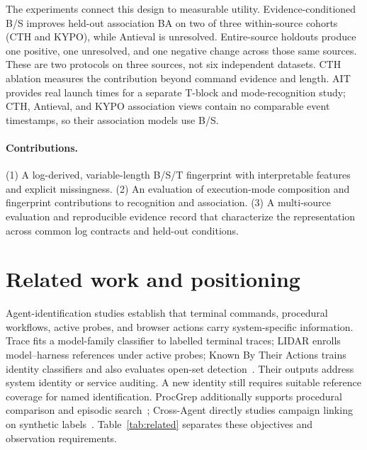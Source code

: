 \documentclass[10pt]{article}
\begin{document}
The experiments connect this design to measurable utility. Evidence-conditioned B/S improves held-out association BA on two of three within-source cohorts (CTH and KYPO), while Antieval is unresolved. Entire-source holdouts produce one positive, one unresolved, and one negative change across those same sources. These are two protocols on three sources, not six independent datasets. CTH ablation measures the contribution beyond command evidence and length. AIT provides real launch times for a separate T-block and mode-recognition study; CTH, Antieval, and KYPO association views contain no comparable event timestamps, so their association models use B/S.

\paragraph{Contributions.} (1) A log-derived, variable-length B/S/T fingerprint with interpretable features and explicit missingness. (2) An evaluation of execution-mode composition and fingerprint contributions to recognition and association. (3) A multi-source evaluation and reproducible evidence record that characterize the representation across common log contracts and held-out conditions.

\section{Related work and positioning}
Agent-identification studies establish that terminal commands, procedural workflows, active probes, and browser actions carry system-specific information. Trace fits a model-family classifier to labelled terminal traces; LIDAR enrolls model--harness references under active probes; Known By Their Actions trains identity classifiers and also evaluates open-set detection~\cite{trace,lidar,known}. Their outputs address system identity or service auditing. A new identity still requires suitable reference coverage for named identification. ProcGrep additionally supports procedural comparison and episodic search~\cite{procgrep}; Cross-Agent directly studies campaign linking on synthetic labels~\cite{crossagent}. Table~\ref{tab:related} separates these objectives and observation requirements.
\end{document}
